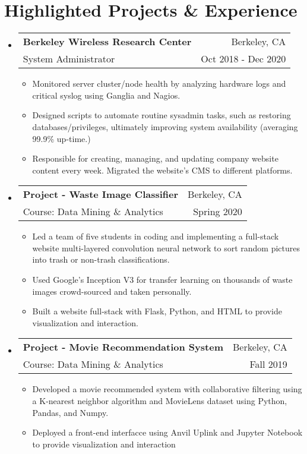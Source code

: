\documentclass[letterpaper,11pt]{article}
\makeatletter
\newcommand{\resumeSubheading}[4]{
	\vspace{-1pt}\item
	\begin{tabular*}{0.97\textwidth}{l@{\extracolsep{\fill}}r}
		\textbf{#1} & #2 \\
		\small#3 & \small #4 \\
	\end{tabular*}\vspace{-5pt}
}
\newcommand{\resumeSubHeadingListStart}{\begin{itemize}[leftmargin=*]}
\newcommand{\resumeSubHeadingListEnd}{\end{itemize}}
\makeatother
\begin{document}
	\section{Highlighted Projects \& Experience}
	\resumeSubHeadingListStart
	\resumeSubheading
	{Berkeley Wireless Research Center}{Berkeley, CA}
	{System Administrator}{Oct 2018 - Dec 2020}
	\begin{itemize}
		\item {Monitored server cluster/node health by analyzing hardware logs and critical syslog using Ganglia and Nagios.}
		\item {Designed scripts to automate routine sysadmin tasks, such as restoring databases/privileges, ultimately improving system availability (averaging 99.9\% up-time.)}
		\item {Responsible for creating, managing, and updating company website content every week. Migrated the website's CMS to different platforms.}
	\end{itemize}
	
	\resumeSubheading
	{Project - Waste Image Classifier}{Berkeley, CA}
	{Course: Data Mining \& Analytics}{Spring 2020}
	\begin{itemize}
		\item {Led a team of five students in coding and implementing a full-stack website multi-layered convolution neural network to sort random pictures into trash or non-trash classifications.}
		\item {Used Google's Inception V3 for transfer learning on thousands of waste images crowd-sourced and taken personally.}
		\item {Built a website full-stack with Flask, Python, and HTML to provide visualization and interaction.}
	\end{itemize}
	\resumeSubheading
	{Project - Movie Recommendation System}{Berkeley, CA}
	{Course: Data Mining \& Analytics}{Fall 2019}
	\begin{itemize}
		\item {Developed a movie recommended system with collaborative filtering using a K-nearest neighbor algorithm and MovieLens dataset using Python, Pandas, and Numpy.}
		\item {Deployed a front-end interfacce using Anvil Uplink and Jupyter Notebook to provide visualization and interaction}
	\end{itemize}
	\resumeSubHeadingListEnd
	
	
\end{document}
